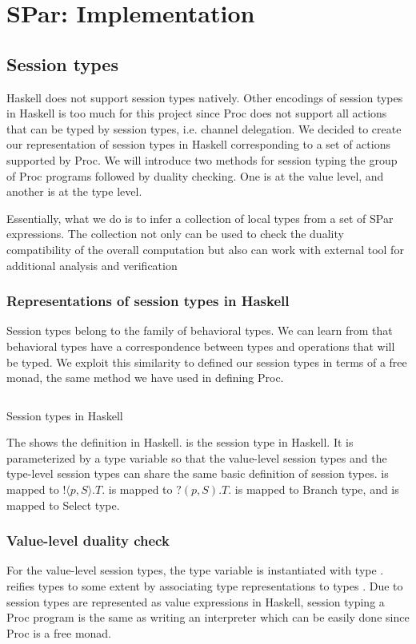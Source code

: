 \chapter{SPar: Implementation} \label{chap:impl}
\section{Session types} \label{impl:sec:session}
Haskell does not support session types natively. Other encodings of session types in Haskell is too much for this project since Proc does not support all actions that can be typed by session types, i.e. channel delegation. We decided to create our representation of session types in Haskell corresponding to a set of actions supported by Proc. We will introduce two methods for session typing the group of Proc programs followed by duality checking. One is at the value level, and another is at the type level.

Essentially, what we do is to infer a collection of local types from a set of SPar expressions. The collection not only can be used to check the duality compatibility of the overall computation but also can work with external tool \cite{langeVerifyingAsynchronousInteractions2019} for additional analysis and verification
\subsection{Representations of session types in Haskell}
Session types belong to the family of behavioral types. We can learn from  that behavioral types have a correspondence between types and operations that will be typed. We exploit this similarity to defined our session types in terms of a free monad, the same method we have used in defining Proc.

\begin{listing}[ht]
    \inputminted{Haskell}{impl/type.hs}
    \caption{Session types in Haskell}
    \label{impl:code:type}
\end{listing}

The  shows the definition in Haskell.  is the session type in Haskell. It is parameterized by a type variable  so that the value-level session types and the type-level session types can share the same basic definition of session types.  is mapped to $! \langle p, S \rangle. T$.  is mapped to $?(p, S).T$.  is mapped to Branch type, and  is mapped to Select type.
\subsection{Value-level duality check}
For the value-level session types, the type variable  is instantiated with type .  reifies types to some extent by associating type representations to types \cite{DataTypeable}. Due to session types are represented as value expressions in Haskell, session typing a Proc program is the same as writing an interpreter which can be easily done since Proc is a free monad. 

